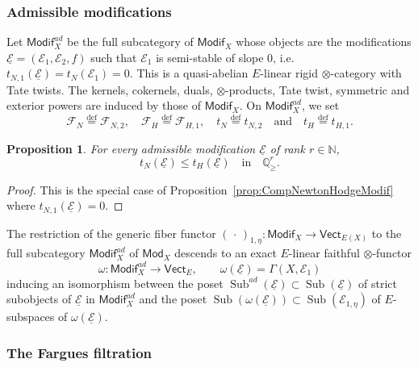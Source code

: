 \documentclass[11pt]{article}
\newtheorem{prop}[theo]{Proposition}
\theoremstyle{definition}
\numberwithin{equation}{section}
\numberwithin{figure}{section}
\numberwithin{table}{section}
\newcommand{\Mod}{\mathsf{Mod}}
\newcommand{\Vect}{\mathsf{Vect}}
\newcommand{\Modif}{\mathsf{Modif}}
\DeclareMathOperator{\Sub}{Sub}
\newcommand{\eqd}{\stackrel{\mathrm{def}}{=}}
\begin{document}
\subsubsection{Admissible modifications}\label{subsec:AdmModifDef}

Let $\Modif_{X}^{ad}$ be the full subcategory of $\Modif_{X}$ whose objects are the modifications $\underline{\mathcal{E}}=(\mathcal{E}_{1},\mathcal{E}_{2},f)$ such that $\mathcal{E}_{1}$ is semi-stable of slope $0$, i.e.~$t_{N,1}(\underline{\mathcal{E}})=t_{N}(\mathcal{E}_{1})=0$. This is a quasi-abelian $E$-linear rigid $\otimes$-category with Tate twists. The kernels, cokernels, duals, $\otimes$-products, Tate twist, symmetric and exterior powers are induced by those of $\Modif_{X}$. On $\Modif_{X}^{ad}$, we set
\[
\mathcal{F}_{N}\eqd\mathcal{F}_{N,2},\quad\mathcal{F}_{H}\eqd\mathcal{F}_{H,1},\quad t_{N}\eqd t_{N,2}\quad\text{and}\quad t_{H}\eqd t_{H,1}.
\]

\begin{prop}\label{prop:OnAdmModif_NewtonHodge}
For every admissible modification $\underline{\mathcal{E}}$ of rank $r\in\mathbb{N}$,
\[
t_{N}(\underline{\mathcal{E}})\leq t_{H}(\underline{\mathcal{E}})\quad\text{in}\quad\mathbb{Q}_{\geq}^{r}.
\]
\end{prop}

\begin{proof}
This is the special case of Proposition~\ref{prop:CompNewtonHodgeModif} where $t_{N,1}(\underline{\mathcal{E}})=0$.
\end{proof}

The restriction of the generic fiber functor $({\,\cdot\,})_{1,\eta}:\Modif_{X}\rightarrow\Vect_{E(X)}$ to the full subcategory $\Modif_{X}^{ad}$ of $\Mod_{X}$ descends to an exact $E$-linear faithful $\otimes$-functor
\[
\omega:\Modif_{X}^{ad}\rightarrow\Vect_{E},\qquad\omega(\underline{\mathcal{E}})=\Gamma(X,\mathcal{E}_{1})
\]
inducing an isomorphism between the poset $\Sub^{ad}(\underline{\mathcal{E}})\subset\Sub(\underline{\mathcal{E}})$ of strict subobjects of $\underline{\mathcal{E}}$ in $\Modif_{X}^{ad}$ and the poset $\Sub(\omega(\underline{\mathcal{E}}))\subset\Sub(\mathcal{E}_{1,\eta})$ of $E$-subspaces of $\omega(\underline{\mathcal{E}})$.

\subsubsection{The Fargues filtration}\label{subsec:DefFarguesFiltrOnModif}
\end{document}
